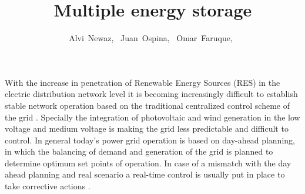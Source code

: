 \documentclass[journal,12pt,onecolumn]{IEEEtran}
\begin{document}
\title{Multiple energy storage}

\author{ Alvi~Newaz,~
Juan~Ospina,~
     Omar~Faruque,~
        }%





\maketitle                                                               
\IEEEpeerreviewmaketitle
With the increase in penetration of Renewable Energy Sources (RES) in the electric distribution network level it is becoming increasingly difficult to establish stable network operation based on the traditional centralized control scheme of the grid \cite{WHY}. Specially the integration of photovoltaic and wind generation in the low voltage and medium voltage is making the grid less predictable and difficult to control. In general today's power grid operation is based on day-ahead planning, in which the balancing of demand and generation of the grid is planned to determine optimum set points of operation. In case of a mismatch with the day ahead planning and real scenario a real-time control is usually put in place to take corrective actions \cite{WHY2}.
\end{document}
